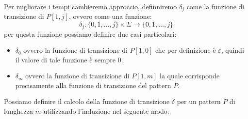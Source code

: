Per migliorare i tempi cambieremo approccio, definniremo $\delta_j$ come la funzione
di transizione di $P[1, j]$, ovvero come una funzione:
\begin{equation}
    \delta_j: \{0, 1, \dots, j\} \times \Sigma \to \{0, 1, \dots, j\}
\end{equation}
per questa funzione possiamo definire due casi particolari:
\begin{itemize}
    \item $\delta_0$ ovvero la funzione di transizione di $P[1, 0]$ che per
          definizione è $\varepsilon$, quindi il valore di tale funzione è sempre $0$.
    \item $\delta_m$ ovvero la funzione di transizione di $P[1, m]$ la quale
          corrisponde precisamente alla funzione di transizione del pattern $P$.
\end{itemize}
Possiamo definire il calcolo della funzione di transizione $\delta$ per un pattern
$P$ di lunghezza $m$ utilizzando l'induzione nel seguente modo:
